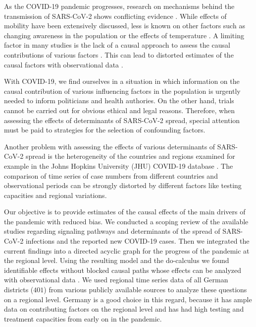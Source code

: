 \documentclass[]{elsarticle} %
\begin{document}
As the COVID-19 pandemic progresses, research on mechanisms behind the
transmission of SARS-CoV-2 shows conflicting evidence
\citep{who2020report, Chinazzi395, guan2020clinical}. While effects of
mobility have been extensively discussed, less is known on other factors
such as changing awareness in the population
\citep{higgins_correlations_2020, li_retrospective_2020, yuan_trends_2020}
or the effects of temperature
\citep{bannister-tyrrell_preliminary_2020, demongeot_temperature_2020, liu_impact_2020}.
A limiting factor in many studies is the lack of a causal approach to
assess the causal contributions of various factors
\citep{Greenland1999}. This can lead to distorted estimates of the
causal factors with observational data
\citep{Greenland1999, schipf_directed_2011, textor_robust_2017}.

With COVID-19, we find ourselves in a situation in which information on
the causal contribution of various influencing factors in the population
is urgently needed to inform politicians and health authories. On the
other hand, trials cannot be carried out for obvious ethical and legal
reasons. Therefore, when assessing the effects of determinants of
SARS-CoV-2 spread, special attention must be paid to strategies for the
selection of confounding factors.

Another problem with assessing the effects of various determinants of
SARS-CoV-2 spread is the heterogeneity of the countries and regions
examined for example in the Johns Hopkins University (JHU) COVID-19
database \citep{jhucovid19db2020}. The comparison of time series of case
numbers from different countries and observational periods can be
strongly distorted by different factors like testing capacities and
regional variations.

Our objective is to provide estimates of the causal effects of the main
drivers of the pandemic with reduced bias. We conducted a scoping review
of the available studies regarding signaling pathways and determinants
of the spread of SARS-CoV-2 infections and the reported new COVID-19
cases. Then we integrated the current findings into a directed acyclic
graph for the progress of the pandemic at the regional level. Using the
resulting model and the do-calculus we found identifiable effects
without blocked causal paths whose effects can be analyzed with
observational data \citep{Pearl_2014}. We used regional time series data
of all German districts (\(401\)) from various publicly available
sources to analyze these questions on a regional level. Germany is a
good choice in this regard, because it has ample data on contributing
factors on the regional level and has had high testing and treatment
capacities from early on in the pandemic.
\end{document}
